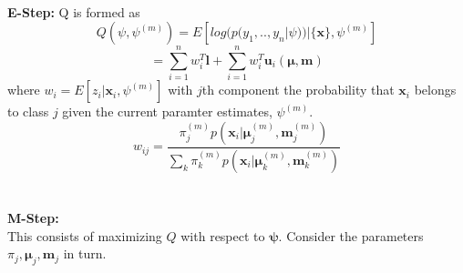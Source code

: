 \documentclass[12pt]{article}
\numberwithin{equation}{section}
\numberwithin{figure}{section}
\numberwithin{table}{section}
\renewcommand{\vec}[1]{\mathbf{#1}}
\begin{document}
\newpage
\normalsize
\textbf{\\E-Step:} Q is formed as\\
\begin{equation*}
Q(\psi,\psi^{(m)}) = E[log(p(y_1,..,y_n|\psi))|\{\vec{x}\},\psi^{(m)}]
\end{equation*}
\begin{equation*}
= \sum\limits_{i=1}^{n}w_{i}^{T}\vec{l} + \sum\limits_{i=1}^{n} w_{i}^{T} \vec{u}_{i}(\vec{\mu},\vec{m})
\end{equation*}
where $w_i = E[z_i|\vec{x}_i,\psi^{(m)}]$ with $j$th component the probability that $\vec{x}_i$ belongs to class $j$ given the current paramter estimates, $\psi^{(m)}$.\\
{\large
\begin{equation*}
w_{ij} = \frac{\pi_{j}^{(m)}p\left( \vec{x}_i|\vec{\mu}^{(m)}_{j},\vec{m}_{j}^{(m)}\right)}{\sum\limits_{k}\pi_{k}^{(m)}p\left( \vec{x}_i|\vec{\mu}^{(m)}_{k},\vec{m}_{k}^{(m)}\right)}
\end{equation*}
}\\\\
\textbf{M-Step:}\\
This consists of maximizing $Q$ with respect to $\vec{\psi}$. Consider the parameters $\pi_j, \vec{\mu}_j, \vec{m}_j$ in turn.
\end{document}
